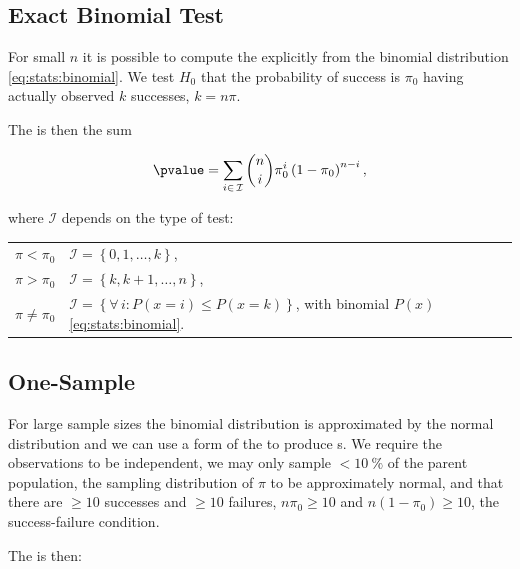 \subsection{Exact Binomial Test}
\label{hypo:binomial_test:exact}

For small $n$ it is possible to compute the \pvalue
explicitly from the binomial distribution \cref{eq:stats:binomial}.
We test $H_{0}$ that the probability of success is $\pi_{0}$
having actually observed $k$ successes, $k = n \pi$.

The \pvalue is then the sum

\begin{equation}\label{eq:hypo:binomial_test:exact}
\pvalue = \sum_{i \in \, \mathcal{I}} \binom{n}{i} \pi_{0}^{i} \left(1-\pi_{0}\right)^{n-i},
\end{equation}

\noindent where $\mathcal{I}$ depends on the type of test:

\begin{table}[H]
\centering
\begin{tabular}{l|l}
$\pi < \pi_{0}$ & $\mathcal{I} = \left\{0, 1, \ldots, k\right\}$, \\
$\pi > \pi_{0}$ & $\mathcal{I} = \left\{k, k+1, \ldots, n\right\}$, \\
$\pi \neq \pi_{0}$ & $\mathcal{I} = \left\{\forall \, i: P\left(x=i\right) \leq P\left(x = k\right)\right\}$, with binomial $P\left(x\right)$ \cref{eq:stats:binomial}.
\end{tabular}
\end{table}

\subsection{One-Sample}
\label{hypo:binomial_test:one}

For large sample sizes the binomial distribution is approximated by the normal distribution
and we can use a form of the \Ztest to produce {\pvalue}s.
We require the observations to be independent,
\ie we may only sample $< \SI{10}{\percent}$ of the parent population,
the sampling distribution of $\pi$ to be approximately normal,
and that there are $\geq 10$ successes and $\geq 10$ failures,
$n \pi_{0} \geq 10$ and $n \left(1-\pi_{0}\right) \geq 10$, \ie the success-failure condition.

The \Zscore is then:

